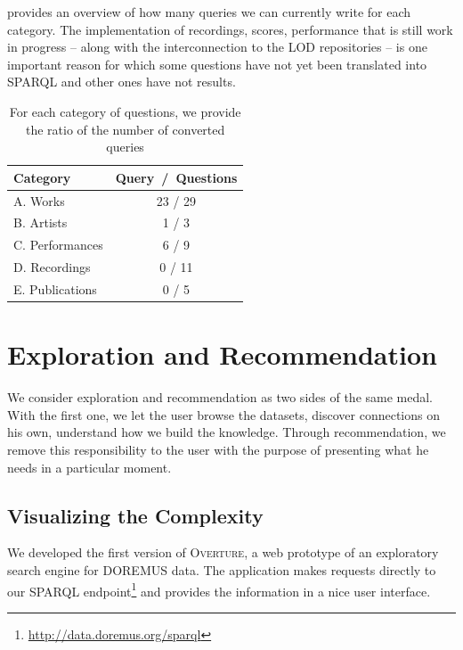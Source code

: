  provides an overview of how many queries we can currently write for each category. The implementation of recordings, scores, performance that is still work in progress -- along with the interconnection to the LOD repositories -- is one important reason for which some questions have not yet been translated into SPARQL and other ones have not results. 

\begin{table}
 \begin{center}
 \begin{tabular}{|l|c|}
  \hline
  Category & Query~/~Questions \\
  \hline
  A. Works & 23 / 29 \\
  \hline
  B. Artists & 1 / 3 \\
  \hline
  C. Performances & 6 / 9 \\
  \hline
  D. Recordings & 0 / 11 \\
  \hline
  E. Publications & 0 / 5 \\
  \hline
 \end{tabular}
\end{center}
 \caption{For each category of questions, we provide the ratio of the number of converted queries}
 \label{tab:queries}
\end{table}

\section{Exploration and Recommendation}\label{sec:explore}
We consider exploration and recommendation as two sides of the same medal. With the first one, we let the user browse the datasets, discover connections on his own, understand how we build the knowledge. Through recommendation, we remove this responsibility to the user with the purpose of presenting what he needs in a particular moment.

\subsection{Visualizing the Complexity}
We developed the first version of \textsc{Overture}, a web prototype of an exploratory search engine for DOREMUS data. The application makes requests directly to our SPARQL endpoint\footnote{\url{http://data.doremus.org/sparql}} and provides the information in a nice user interface.

